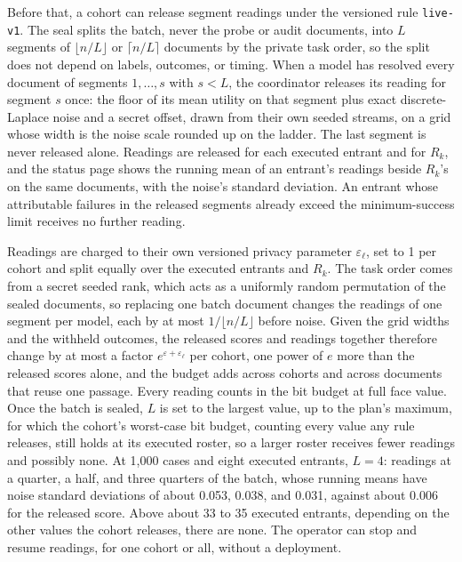 Before that, a cohort can release segment readings under the versioned rule
\texttt{live-v1}. The seal splits the batch, never the probe or audit
documents, into \(L\) segments of \(\lfloor n/L\rfloor\) or \(\lceil
n/L\rceil\) documents by the private task order, so the split does not depend
on labels, outcomes, or timing. When a model has resolved every document of
segments \(1,\dots,s\) with \(s<L\), the coordinator releases its reading for
segment \(s\) once: the floor of its mean utility on that segment plus exact
discrete-Laplace noise and a secret offset, drawn from their own seeded
streams, on a grid whose width is the noise scale rounded up on the ladder. The
last segment is never released alone. Readings are released for each executed
entrant and for \(R_k\), and the status page shows the running mean of an
entrant's readings beside \(R_k\)'s on the same documents, with the noise's
standard deviation. An entrant whose attributable failures in the released
segments already exceed the minimum-success limit receives no further reading.

Readings are charged to their own versioned privacy parameter
\(\varepsilon_\ell\), set to 1 per cohort and split equally over the executed
entrants and \(R_k\). The task order comes from a secret seeded rank, which
acts as a uniformly random permutation of the sealed documents, so replacing
one batch document changes the readings of one segment per model, each by at
most \(1/\lfloor n/L\rfloor\) before noise. Given the grid widths and the
withheld outcomes, the released scores and readings together therefore change
by at most a factor \(e^{\varepsilon+\varepsilon_\ell}\) per cohort, one power
of \(e\) more than the released scores alone, and the budget adds across
cohorts and across documents that reuse one passage. Every reading counts in the bit budget at
full face value. Once the batch is sealed, \(L\) is set to the largest value,
up to the plan's maximum, for which the cohort's worst-case bit budget,
counting every value any rule releases, still holds at its executed roster, so
a larger roster receives fewer readings and possibly none. At 1,000 cases and
eight executed entrants, \(L=4\): readings at a quarter, a half, and three
quarters of the batch, whose running means have noise standard deviations of
about 0.053, 0.038, and 0.031, against about 0.006 for the released score.
Above about 33 to 35 executed entrants, depending on the other values the
cohort releases, there are none. The operator can stop and resume readings,
for one cohort or all, without a deployment.

